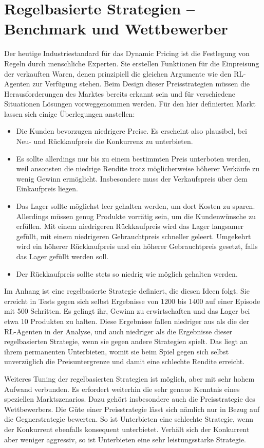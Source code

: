 \section{Regelbasierte Strategien -- Benchmark und Wettbewerber}
\label{section:rulebased}
Der heutige Industriestandard für das Dynamic Pricing ist die Festlegung von Regeln durch menschliche Experten.
Sie erstellen Funktionen für die Einpreisung der verkauften Waren, denen prinzipiell die gleichen Argumente wie den RL-Agenten zur Verfügung stehen.
Beim Design dieser Preisstrategien müssen die Herausforderungen des Marktes bereits erkannt sein und für verschiedene Situationen Lösungen vorweggenommen werden.
Für den hier definierten Markt lassen sich einige Überlegungen anstellen:
\begin{itemize}
	\item Die Kunden bevorzugen niedrigere Preise.
	Es erscheint also plausibel, bei Neu- und Rückkaufpreis die Konkurrenz zu unterbieten.
	\item Es sollte allerdings nur bis zu einem bestimmten Preis unterboten werden, weil ansonsten die niedrige Rendite trotz möglicherweise höherer Verkäufe zu wenig Gewinn ermöglicht.
	Insbesondere muss der Verkaufspreis über dem Einkaufpreis liegen.
	\item Das Lager sollte möglichst leer gehalten werden, um dort Kosten zu sparen.
	Allerdings müssen genug Produkte vorrätig sein, um die Kundenwünsche zu erfüllen.
	Mit einem niedrigeren Rückkaufpreis wird das Lager langsamer gefüllt, mit einem niedrigeren Gebrauchtpreis schneller geleert.
	Umgekehrt wird ein höherer Rückkaufpreis und ein höherer Gebrauchtpreis gesetzt, falls das Lager gefüllt werden soll.
	\item Der Rückkaufpreis sollte stets so niedrig wie möglich gehalten werden.
\end{itemize}
Im Anhang ist eine regelbasierte Strategie definiert, die diesen Ideen folgt.
Sie erreicht in Tests gegen sich selbst Ergebnisse von 1200 bis 1400 auf einer Episode mit 500 Schritten.
Es gelingt ihr, Gewinn zu erwirtschaften und das Lager bei etwa 10 Produkten zu halten.
Diese Ergebnisse fallen niedriger aus als die der RL-Agenten in der Analyse, und auch niedriger als die Ergebnisse dieser regelbasierten Strategie, wenn sie gegen andere Strategien spielt.
Das liegt an ihrem permanenten Unterbieten, womit sie beim Spiel gegen sich selbst unverzüglich die Preisuntergrenze und damit eine schlechte Rendite erreicht.

Weiteres Tuning der regelbasierten Strategien ist möglich, aber mit sehr hohem Aufwand verbunden.
Es erfordert weiterhin die sehr genaue Kenntnis eines speziellen Marktszenarios.
Dazu gehört insbesondere auch die Preisstrategie des Wettbewerbers.
Die Güte einer Preisstrategie lässt sich nämlich nur in Bezug auf die Gegnerstrategie bewerten.
So ist Unterbieten eine schlechte Strategie, wenn der Konkurrent ebenfalls konsequent unterbietet.
Verhält sich der Konkurrent aber weniger aggressiv, so ist Unterbieten eine sehr leistungsstarke Strategie.